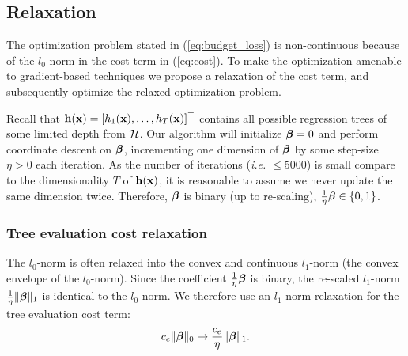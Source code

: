 \subsection{Relaxation}
The optimization problem stated in (\ref{eq:budget_loss}) is non-continuous because of the $l_0$ norm in the cost term in (\ref{eq:cost}). To make the optimization amenable to gradient-based techniques we propose a relaxation of the cost term, and subsequently optimize the relaxed optimization problem. 

Recall that $\mathbf{h}(\mathbf{x}) = [h_1(\mathbf{x}),\dots,h_T(\mathbf{x})]^\top$ contains all possible regression trees of some limited depth from ${\cal H}$. Our algorithm will initialize $\boldsymbol{\beta} = 0$ and perform coordinate descent on $\boldsymbol{\beta}$, incrementing one dimension of $\boldsymbol{\beta}$ by some step-size $\eta > 0$ each iteration. As the number of iterations (\emph{i.e.} $\le 5000$) is small compare to the dimensionality $T$ of  $\mathbf{h}(\mathbf{x})$, it is reasonable to assume we never update the same dimension twice. 
Therefore, $\boldsymbol{\beta}$ is binary (up to re-scaling), $\frac{1}{\eta}\boldsymbol{\beta} \in \{0,1\}$.

\subsubsection{Tree evaluation cost relaxation}
The $l_0$-norm is often relaxed into the convex and continuous $l_1$-norm (the convex envelope of the $l_0$-norm). Since the coefficient $\frac{1}{\eta}\boldsymbol{\beta}$ is binary, the re-scaled $l_1$-norm $ \frac{1}{\eta} \| \boldsymbol{\beta}\|_1$ is identical to the $l_0$-norm. We therefore use an $l_1$-norm relaxation for the tree evaluation cost term:
\begin{align}
	c_e\|\boldsymbol{\beta}\|_0 \rightarrow \frac{c_e}{\eta} \|\boldsymbol{\beta}\|_1.
\end{align}

